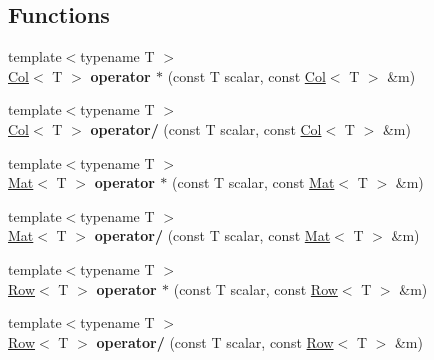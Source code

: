 \subsection*{Functions}
\begin{DoxyCompactItemize}
\item 
\mbox{\label{namespacetao_a1883c3bd00846982739b0af933521859}} 
{\footnotesize template$<$typename T $>$ }\\\mbox{\hyperlink{classtao_1_1_col}{Col}}$<$ T $>$ {\bfseries operator $\ast$} (const T scalar, const \mbox{\hyperlink{classtao_1_1_col}{Col}}$<$ T $>$ \&m)
\item 
\mbox{\label{namespacetao_a15f31e477a94ea2195b3cac2025ffe50}} 
{\footnotesize template$<$typename T $>$ }\\\mbox{\hyperlink{classtao_1_1_col}{Col}}$<$ T $>$ {\bfseries operator/} (const T scalar, const \mbox{\hyperlink{classtao_1_1_col}{Col}}$<$ T $>$ \&m)
\item 
\mbox{\label{namespacetao_abe18d9333a0aa68b5fb9535f88f8c7c7}} 
{\footnotesize template$<$typename T $>$ }\\\mbox{\hyperlink{classtao_1_1_mat}{Mat}}$<$ T $>$ {\bfseries operator $\ast$} (const T scalar, const \mbox{\hyperlink{classtao_1_1_mat}{Mat}}$<$ T $>$ \&m)
\item 
\mbox{\label{namespacetao_abf17cac5ef62ed5f9e99d76bea213144}} 
{\footnotesize template$<$typename T $>$ }\\\mbox{\hyperlink{classtao_1_1_mat}{Mat}}$<$ T $>$ {\bfseries operator/} (const T scalar, const \mbox{\hyperlink{classtao_1_1_mat}{Mat}}$<$ T $>$ \&m)
\item 
\mbox{\label{namespacetao_a10fc7c6c01e0a7411896c5d7bae8ea40}} 
{\footnotesize template$<$typename T $>$ }\\\mbox{\hyperlink{classtao_1_1_row}{Row}}$<$ T $>$ {\bfseries operator $\ast$} (const T scalar, const \mbox{\hyperlink{classtao_1_1_row}{Row}}$<$ T $>$ \&m)
\item 
\mbox{\label{namespacetao_a3cf82a9d58ae2cd23dcb3776ea102b96}} 
{\footnotesize template$<$typename T $>$ }\\\mbox{\hyperlink{classtao_1_1_row}{Row}}$<$ T $>$ {\bfseries operator/} (const T scalar, const \mbox{\hyperlink{classtao_1_1_row}{Row}}$<$ T $>$ \&m)

\end{DoxyCompactItemize}
